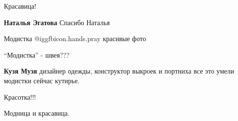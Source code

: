  
 
 
 
 

Красавица!

\textbf{Наталья Эгатова} Спасибо Наталья

Модистка  @igg{fbicon.hands.pray} красивые фото

\enquote{Модистка} - швея???

\textbf{Кузя Музя} дизайнер одежды, конструктор выкроек и портниха все это умели модистки сейчас кутирье.

Красотка!!!

Модница и красавица.
